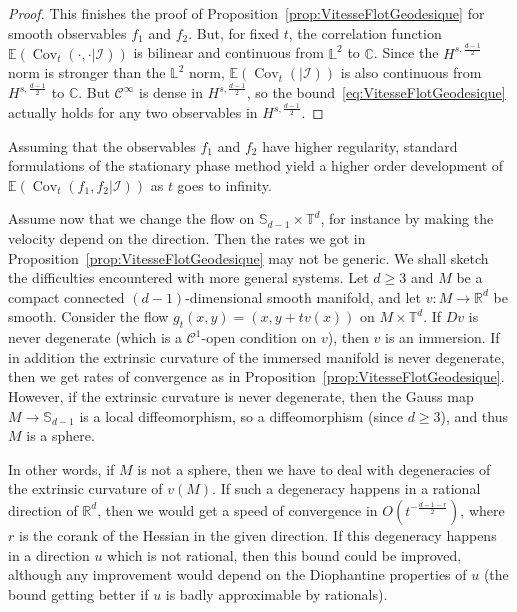 \documentclass[10pt]{amsart}
\theoremstyle{definition}\newtheorem{defi}[theo]{Definition}\newtheorem{rema}[theo]{Remark}\newtheorem{exam}[theo]{Example}\newtheorem{exem}[theo]{Example}\newtheorem{nota}[theo]{Notation}
\DeclareMathOperator{\Cov}{Cov}
\newcommand{\R}{\mathbb{R}}
\newcommand{\Cbb}{\mathbb{C}}
\newcommand{\Ebb}{\mathbb{E}}
\newcommand{\Lbb}{\mathbb{L}}
\newcommand{\Sbb}{\mathbb{S}}
\newcommand{\Tbb}{\mathbb{T}}
\newcommand{\Ccal}{\mathcal{C}}
\newcommand{\Ical}{\mathcal{I}}
\begin{document}
\begin{proof}
This finishes the proof of Proposition~\ref{prop:VitesseFlotGeodesique} for smooth observables $f_1$ and $f_2$. But, for fixed $t$, the correlation function $\Ebb(\Cov_t(\cdot,\cdot|\Ical))$ is bilinear and continuous from $\Lbb^2$ to $\Cbb$. Since the $H^{s,\frac{d-1}{2}}$ norm is stronger than the $\Lbb^2$ norm, $\Ebb(\Cov_t(|\Ical))$ is also continuous from $H^{s,\frac{d-1}{2}}$ to $\Cbb$. But $\Ccal^\infty$ is dense in $H^{s,\frac{d-1}{2}}$, so the bound~\eqref{eq:VitesseFlotGeodesique} actually holds for any two observables in $H^{s,\frac{d-1}{2}}$.
\end{proof}

Assuming that the observables $f_1$ and $f_2$ have higher regularity, standard formulations of the stationary phase method yield a higher order development of $\Ebb(\Cov_t (f_1, f_2|\Ical))$ as $t$ goes to infinity.


Assume now that we change the flow on $\Sbb_{d-1} \times \Tbb^d$, for instance by making the velocity depend on the direction. Then the rates we got in Proposition~\ref{prop:VitesseFlotGeodesique} may not be generic. We shall sketch the difficulties encountered with more general systems. Let $d \geq 3$ and $M$ be a compact connected $(d-1)$-dimensional smooth manifold, and let $v : M \to \R^d$ be smooth. Consider the flow $g_t (x,y)=(x,y+tv(x))$ on $M \times \Tbb^d$. If $Dv$ is never degenerate (which is a $\Ccal^1$-open condition on $v$), then $v$ is an immersion. If in addition the extrinsic curvature of the immersed manifold is never degenerate, then we get rates of convergence as in Proposition~\ref{prop:VitesseFlotGeodesique}. However, if the extrinsic curvature is never degenerate, then the Gauss map $M \to \Sbb_{d-1}$ is a local diffeomorphism, so a diffeomorphism (since $d \geq 3$), and thus $M$ is a sphere.


In other words, if $M$ is not a sphere, then we have to deal with degeneracies of the extrinsic curvature of $v(M)$. If such a degeneracy happens in a rational direction of $\R^d$, then we would get a speed of convergence in $O (t^{-\frac{d-1-r}{2}})$, where $r$ is the corank of the Hessian in the given direction. If this degeneracy happens in a direction $u$ which is not rational, then this bound could be improved, although any improvement would depend on the Diophantine properties of $u$ (the bound getting better if $u$ is badly approximable by rationals).

\end{document}
